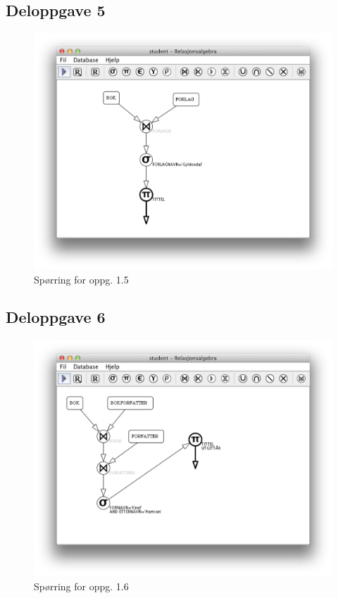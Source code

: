\documentclass[a4paper, 12pt] {article}
\begin{document}
\subsection{Deloppgave 5}
\begin{figure}[h!]
    \includegraphics[width=\linewidth]{img/1-5.png}
    \caption{Spørring for oppg. 1.5 \label{img:1.5}}
\end{figure}
\newpage

\subsection{Deloppgave 6}
\begin{figure}[h!]
    \includegraphics[width=\linewidth]{img/1-6.png}
    \caption{Spørring for oppg. 1.6 \label{img:1.6}}
\end{figure}
\newpage
\end{document}
